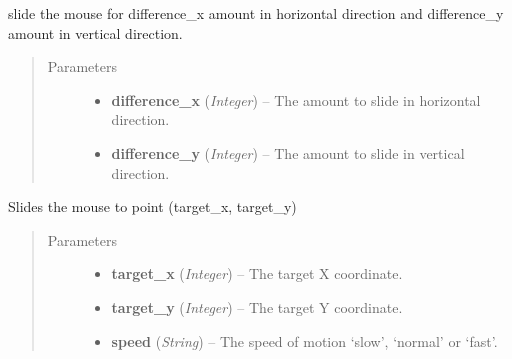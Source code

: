 \documentclass[letterpaper,10pt,english]{sphinxmanual}
\begin{document}
\begin{fulllineitems}
\label{macro:macro.slide}
slide the mouse for difference\_x amount in horizontal direction and
difference\_y amount in vertical direction.
\begin{quote}\begin{description}
\item[{Parameters}] \leavevmode\begin{itemize}
\item {} 
\textbf{difference\_x} (\emph{Integer}) -- The amount to slide in horizontal direction.

\item {} 
\textbf{difference\_y} (\emph{Integer}) -- The amount to slide in vertical direction.

\end{itemize}

\end{description}\end{quote}

\end{fulllineitems}


\begin{fulllineitems}
\label{macro:macro.slide_to}
Slides the mouse to point (target\_x, target\_y)
\begin{quote}\begin{description}
\item[{Parameters}] \leavevmode\begin{itemize}
\item {} 
\textbf{target\_x} (\emph{Integer}) -- The target X coordinate.

\item {} 
\textbf{target\_y} (\emph{Integer}) -- The target Y coordinate.

\item {} 
\textbf{speed} (\emph{String}) -- The speed of motion `slow', `normal' or `fast'.

\end{itemize}

\end{description}\end{quote}

\end{fulllineitems}
\end{document}
